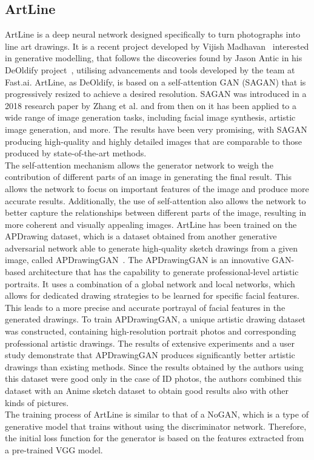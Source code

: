 \subsection{ArtLine}
ArtLine is a deep neural network designed specifically to turn photographs into line art drawings. It is a recent project developed by Vijish Madhavan~\cite{artline} interested in generative modelling, that follows the discoveries found by Jason Antic in his DeOldify project~\cite{deoldify}, utilising advancements and tools developed by the team at Fast.ai. ArtLine, as DeOldify, is based on a self-attention GAN (SAGAN) that is progressively resized to achieve a desired resolution. SAGAN was introduced in a 2018 research paper by Zhang et al.\cite{SaGAN} and from then on it has been applied to a wide range of image generation tasks, including facial image synthesis, artistic image generation, and more. The results have been very promising, with SAGAN producing high-quality and highly detailed images that are comparable to those produced by state-of-the-art methods. \\
The self-attention mechanism allows the generator network to weigh the contribution of different parts of an image in generating the final result. This allows the network to focus on important features of the image and produce more accurate results. Additionally, the use of self-attention also allows the network to better capture the relationships between different parts of the image, resulting in more coherent and visually appealing images.
ArtLine has been trained on the APDrawing dataset, which is a dataset obtained from another generative adversarial network able to generate high-quality sketch drawings from a given image, called APDrawingGAN~\cite{APDrawingGAN}. The APDrawingGAN is an innovative GAN-based architecture that has the capability to generate professional-level artistic portraits. It uses a combination of a global network and local networks, which allows for dedicated drawing strategies to be learned for specific facial features. This leads to a more precise and accurate portrayal of facial features in the generated drawings. To train APDrawingGAN, a unique artistic drawing dataset was constructed, containing high-resolution portrait photos and corresponding professional artistic drawings. The results of extensive experiments and a user study demonstrate that APDrawingGAN produces significantly better artistic drawings than existing methods. Since the results obtained by the authors using this dataset were good only in the case of ID photos, the authors combined this dataset with an Anime sketch dataset to obtain good results also with other kinds of pictures.\\
The training process of ArtLine is similar to that of a NoGAN, which is a type of generative model that trains without using the discriminator network. Therefore, the initial loss function for the generator is based on the features extracted from a pre-trained VGG model.

